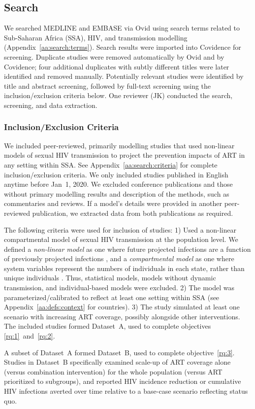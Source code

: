 \subsection{Search}
\label{ss:meth:search}
We searched MEDLINE and EMBASE via Ovid
using search terms related to Sub-Saharan Africa (SSA), HIV, and transmission modelling
(Appendix~\ref{aa:search:terms}).
Search results were imported into Covidence \cite{Covidence} for screening.
Duplicate studies were removed automatically by Ovid and by Covidence;
four additional duplicates with subtly different titles were later identified and removed manually.
Potentially relevant studies were identified by title and abstract screening, followed 
by full-text screening using the inclusion/exclusion criteria below. 
One reviewer (JK) conducted the search, screening, and data extraction.
\subsubsection{Inclusion/Exclusion Criteria}
\label{sss:meth:criteria}
We included peer-reviewed, primarily modelling studies that used non-linear models of sexual HIV transmission
to project the prevention impacts of ART in any setting within SSA.
See Appendix~\ref{aa:search:criteria} for complete inclusion/exclusion criteria.
We only included studies published in English anytime before Jan~1, 2020.
We excluded conference publications and those without primary modelling results and description of the methods,
such as commentaries and reviews.
If a model's details were provided in another peer-reviewed publication,
we extracted data from both publications as required.
\par
The following criteria were used for inclusion of studies:
1) Used a non-linear compartmental model of sexual HIV transmission at the population level.
We defined a \emph{non-linear model} as one where
future projected infections are a function of previously projected infections \cite{Garnett2011},
and a \emph{compartmental model} as one where
system variables represent the numbers of individuals in each state,
rather than unique individuals \cite{Garnett2011}.
Thus, statistical models, models without dynamic transmission, and individual-based models were excluded.
2) The model was parameterized/calibrated to reflect at least one setting within SSA
(see Appendix~\ref{aa:defs:context} for countries).
3) The study simulated at least one scenario with increasing ART coverage,
possibly alongside other interventions.
The included studies formed Dataset~A,
used to complete objectives \ref{rq:1}~and~\ref{rq:2}.
\par
A subset of Dataset~A formed Dataset~B,
used to complete objective~\ref{rq:3}.
Studies in Dataset~B specifically examined
scale-up of ART coverage alone (versus combination intervention)
for the whole population (versus ART prioritized to subgroups),
and reported HIV incidence reduction or cumulative HIV infections averted over time 
relative to a base-case scenario reflecting status quo.
